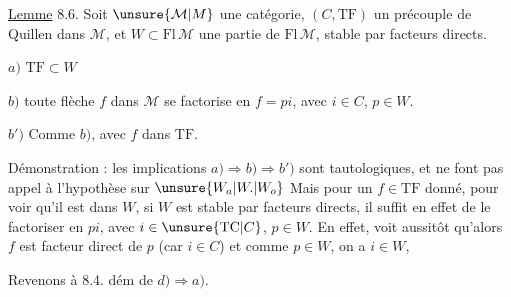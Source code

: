 
\uline{Lemme} 8.6. Soit $\unsure{\mathcal{M}|M}$ une catégorie, $(C,\mathrm{TF})$
un précouple de Quillen dans $\mathcal{M}$, et $W\subset\mathrm{Fl}\,\mathcal{M}$ une partie de $\mathrm{Fl}\,\mathcal{M}$, stable par facteurs directs.
 

$a)$  $\mathrm{TF}\subset W$

$b)$ toute flèche $f$ dans $\mathcal{M}$ se factorise en $f=pi$, avec $i\in C$, $p\in W$.

$b')$ Comme $b)$, avec $f$ dans $\mathrm{TF}$.

Démonstration : les implications $a)\Rightarrow b)\Rightarrow b')$
sont tautologiques, et ne font pas appel à l'hypothèse  sur $\unsure{W_a|W.|W_o}$
Mais pour un $f\in\mathrm{TF}$ donné, pour voir qu'il est dans
$W$,  si $W$ est stable par facteurs directs, il suffit en effet de
le factoriser en $pi$, avec $i\in\unsure{\mathrm{TC}|C}$, $p\in W$.
En effet,  voit aussitôt qu'alors
$f$ est facteur direct de $p$ (car $i\in C$) et comme $p\in W$, on a $i\in W$, 

Revenons à 8.4. dém de $d)\Rightarrow a)$.

